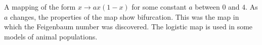 
A mapping of the form $x \to ax(1-x)$ for some constant $a$ between $0$ and $4$. As $a$ changes, the properties of the map show bifurcation. This was the map in which the Feigenbaum number was discovered. The logistic map is used in some models of animal populations.
  
  
  
  